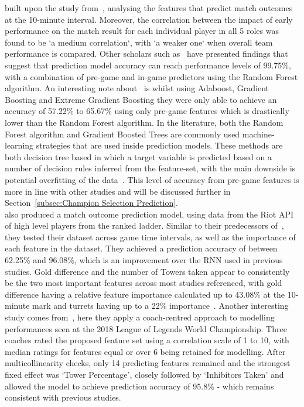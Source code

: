 \citet{gaina2018league} built upon the study from~\citet{lin2016league}, analysing the features that predict match outcomes at the 10-minute interval.
Moreover, the correlation between the impact of early performance on the match result for each individual player in all 5 roles was found to be `a medium correlation`, with `a weaker one` when overall team performance is compared.
Other scholars such as~\citet{ani2019victory} have presented findings that suggest that prediction model accuracy can reach performance levels of 99.75\%, with a combination of pre-game and in-game predictors using the Random Forest algorithm.
An interesting note about~\citet{ani2019victory} is whilst using Adaboost, Gradient Boosting and Extreme Gradient Boosting they were only able to achieve an accuracy of 57.22\% to 65.67\% using only pre-game features which is drastically lower than the Random Forest algorithm.
In the literature, both the Random Forest algorithm and Gradient Boosted Trees are commonly used machine-learning strategies that are used inside prediction models.
These methods are both decision tree based in which a target variable is predicted based on a number of decision rules inferred from the feature-set, with the main downside is potential overfitting of the data~\citep{scikitDecisionTrees}.
This level of accuracy from pre-game features is more in line with other studies and will be discussed further in Section~\ref{subsec:Champion Selection Prediction}. \\

\citet{lee2020predicting} also produced a match outcome prediction model, using data from the Riot API of high level players from the ranked ladder.
Similar to their predecessors of~\citet{silva2018continuous}, they tested their dataset across game time intervals, as well as the importance of each feature in the dataset.
They achieved a prediction accuracy of between 62.25\% and 96.08\%, which is an improvement over the \ac{RNN} used in previous studies.
Gold difference and the number of Towers taken appear to consistently be the two most important features across most studies referenced, with gold difference having a relative feature importance calculated up to 43.08\% at the 10-minute mark and turrets having up to a 22\% importance~\citep{lee2020predicting, ani2019victory, gaina2018league}.
Another interesting study comes from~\citet{novak2020performance}, here they apply a coach-centred approach to modelling performances seen at the 2018 League of Legends World Championship.
Three coaches rated the proposed feature set using a correlation scale of 1 to 10, with median ratings for features equal or over 6 being retained for modelling.
After multicollinearity checks, only 14 predicting features remained and the strongest fixed effect was `Tower Percentage', closely followed by `Inhibitors Taken' and allowed the model to achieve prediction accuracy of 95.8\% - which remains consistent with previous studies.


